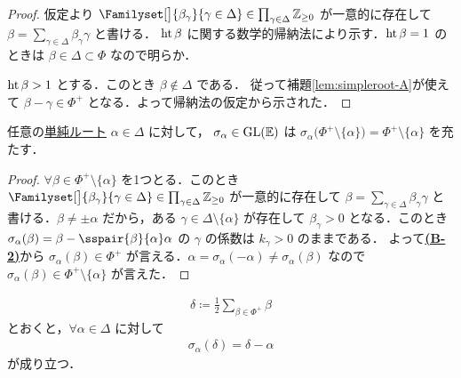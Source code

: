 \documentclass[rep_main]{subfiles}
\begin{document}
\begin{proof}
	仮定より $\Familyset[\big]{\beta_\gamma}{\gamma \in \Delta} \in \prod_{\gamma \in \Delta} \mathbb{Z}_{\ge 0}$ が一意的に存在して $\beta = \sum_{\gamma \in \Delta} \beta_\gamma \gamma$ と書ける．
	$\operatorname{ht} \beta$ に関する数学的帰納法により示す．$\operatorname{ht} \beta = 1$ のときは $\beta \in \Delta \subset \Phi$ なので明らか．

	$\operatorname{ht} \beta > 1$ とする．このとき $\beta \notin \Delta$ である．
	従って補題\ref{lem:simpleroot-A}が使えて $\beta - \gamma \in \Phi^+$ となる．よって帰納法の仮定から示された．
\end{proof}

\begin{mylem}[label=lem:simpleroot-B]{}
	任意の\hyperref[def:base-root]{単純ルート} $\alpha \in \Delta$ に対して，
	$\sigma_\alpha \in \mathrm{GL}(\mathbb{E})$ は $\sigma_\alpha\bigl(\Phi^+ \setminus \{\alpha\}\bigr) = \Phi^+ \setminus \{\alpha\}$ を充たす．
\end{mylem}

\begin{proof}
	$\forall \beta \in \Phi^+ \setminus \{\alpha\}$ を1つとる．このとき  $\Familyset[\big]{\beta_\gamma}{\gamma \in \Delta} \in \prod_{\gamma \in \Delta} \mathbb{Z}_{\ge 0}$ が一意的に存在して $\beta = \sum_{\gamma \in \Delta} \beta_\gamma \gamma$ と書ける．$\beta \neq \pm \alpha$ だから，ある $\gamma \in \Delta \setminus \{\alpha\}$ が存在して $\beta_\gamma > 0$ となる．このとき $\sigma_\alpha(\beta) = \beta - \sspair{\beta}{\alpha} \alpha$ の $\gamma$ の係数は $k_\gamma > 0$ のままである．
	よって\hyperref[ax:root-system]{\textsf{\textbf{(B-2)}}}から $\sigma_\alpha(\beta) \in \Phi^+$ が言える．$\alpha = \sigma_\alpha (-\alpha) \neq \sigma_\alpha(\beta)$ なので $\sigma_\alpha(\beta) \in \Phi^+ \setminus \{\alpha\}$ が言えた．
\end{proof}

\begin{mycol}[label=col:simpleroot-B]{}
	\begin{align}
		\delta \coloneqq \frac{1}{2} \sum_{\beta \in \Phi^+} \beta
	\end{align}
	とおくと，$\forall \alpha \in \Delta$ に対して
	\begin{align}
		\sigma_\alpha(\delta) = \delta -\alpha
	\end{align}
	が成り立つ．
\end{mycol}
\end{document}
